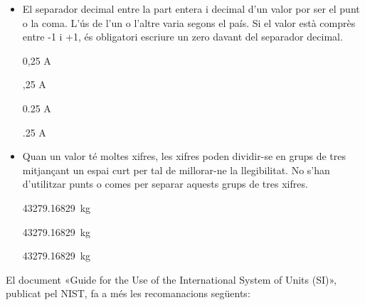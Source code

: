 \begin{itemize}
\textcolor{Red}\faTimesCircle{}   I = 36\unit{kA}


\item El separador decimal entre la part entera i decimal d'un valor por ser el punt o la coma. L'ús de l'un o l'altre varia segons el país. Si el valor està comprès entre -1 i +1, és obligatori escriure un zero davant del separador decimal.

\textcolor{Green}\faCheckSquare{} 0,25 A

\textcolor{Red}\faTimesCircle{}  ,25 A

\textcolor{Green}\faCheckSquare{} 0.25 A

\textcolor{Red}\faTimesCircle{}  .25 A


\item Quan un valor té moltes xifres, les xifres poden dividir-se en grups de tres mitjançant un espai curt per tal de millorar-ne la llegibilitat. No s'han d'utilitzar punts o comes per separar aquests grups de tres xifres.

\textcolor{Green}\faCheckSquare{} \SI{43279,16829}{kg}

\textcolor{Green}\faCheckSquare{} \SI[group-separator =]{43279,16829}{kg}

\textcolor{Red}\faTimesCircle{}  \SI[group-separator = .]{43279,16829}{kg}

\end{itemize}

El document  «Guide for the Use of the International System of Units (SI)», publicat pel NIST,  fa a més les recomanacions següents:

